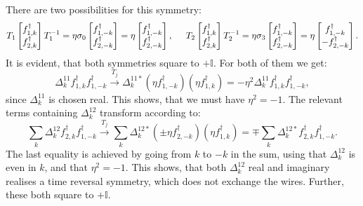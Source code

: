 There are two possibilities for this symmetry: 
\begin{equation}
T_1 \begin{bmatrix} f^\dagger_{1,k} \\ f^\dagger_{2,k} \end{bmatrix} T_1^{-1} = \eta\sigma_0 \begin{bmatrix} f^\dagger_{1,-k} \\ f^\dagger_{2,-k} \end{bmatrix} = \eta\begin{bmatrix} f^\dagger_{1,-k} \\ f^\dagger_{2,-k} \end{bmatrix}, \hspace{0.5cm} T_2 \begin{bmatrix} f^\dagger_{1,k} \\ f^\dagger_{2,k} \end{bmatrix} T_2^{-1} = \eta\sigma_3 \begin{bmatrix} f^\dagger_{1,-k} \\ f^\dagger_{2,-k} \end{bmatrix} = \eta\begin{bmatrix} f^\dagger_{1,-k} \\  - f^\dagger_{2,-k} \end{bmatrix}. \nonumber
\end{equation} 
It is evident, that both symmetries square to $+\mathbb{I}$. For both of them we get: 
\begin{equation}
\Delta^{11}_k f^\dagger_{1,k}f^\dagger_{1,-k} \overset{T_j}{\to} \Delta^{11*}_k \left(\eta f^\dagger_{1,-k}\right)\left(\eta f^\dagger_{1,k}\right) = -\eta^2\Delta^{11}_k f^\dagger_{1,k}f^\dagger_{1,-k}, \nonumber
\end{equation}
since $\Delta^{11}_k$ is chosen real. This shows, that we must have $\eta^2 = -1$. The relevant terms containing $\Delta^{12}_k$ transform according to:
\begin{equation}
\sum_k \Delta^{12}_k f^\dagger_{2,k}f^\dagger_{1,-k} \overset{T_j}{\to} \sum_k \Delta^{12*}_k \left(\pm \eta f^\dagger_{2,-k}\right)\left( \eta f^\dagger_{1,k}\right) = \mp \sum_k \Delta^{12*}_{k} f^\dagger_{2,k}f^\dagger_{1,-k}. \nonumber
\end{equation}
The last equality is achieved by going from $k$ to $-k$ in the sum, using that $\Delta^{12}_k$ is even in $k$, and that $\eta^2 = -1$. This shows, that both $\Delta^{12}_k$ real and imaginary realises a time reversal symmetry, which does not exchange the wires. Further, these both square to $+\mathbb{I}$.

